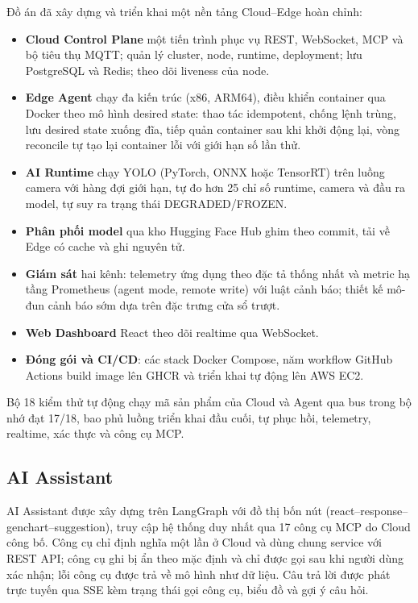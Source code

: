 Đồ án đã xây dựng và triển khai một nền tảng Cloud--Edge hoàn chỉnh:
\begin{itemize}
  \item \textbf{Cloud Control Plane} một tiến trình phục vụ REST, WebSocket, MCP
        và bộ tiêu thụ MQTT; quản lý cluster, node, runtime, deployment; lưu
        PostgreSQL và Redis; theo dõi liveness của node.
  \item \textbf{Edge Agent} chạy đa kiến trúc (x86, ARM64), điều khiển container
        qua Docker theo mô hình desired state: thao tác idempotent, chống lệnh
        trùng, lưu desired state xuống đĩa, tiếp quản container sau khi khởi động
        lại, vòng reconcile tự tạo lại container lỗi với giới hạn số lần thử.
  \item \textbf{AI Runtime} chạy YOLO (PyTorch, ONNX hoặc TensorRT) trên luồng
        camera với hàng đợi giới hạn, tự đo hơn 25 chỉ số runtime, camera và đầu ra
        model, tự suy ra trạng thái DEGRADED/FROZEN.
  \item \textbf{Phân phối model} qua kho Hugging Face Hub ghim theo commit, tải về
        Edge có cache và ghi nguyên tử.
  \item \textbf{Giám sát} hai kênh: telemetry ứng dụng theo đặc tả thống nhất và
        metric hạ tầng Prometheus (agent mode, remote write) với luật cảnh báo;
        thiết kế mô-đun cảnh báo sớm dựa trên đặc trưng cửa sổ trượt.
  \item \textbf{Web Dashboard} React theo dõi realtime qua WebSocket.
  \item \textbf{Đóng gói và CI/CD}: các stack Docker Compose, năm workflow GitHub
        Actions build image lên GHCR và triển khai tự động lên AWS EC2.
\end{itemize}
Bộ 18 kiểm thử tự động chạy mã sản phẩm của Cloud và Agent qua bus trong bộ nhớ
đạt 17/18, bao phủ luồng triển khai đầu cuối, tự phục hồi, telemetry, realtime,
xác thực và công cụ MCP.

\subsection{AI Assistant}

AI Assistant được xây dựng trên LangGraph với đồ thị bốn nút
(react--response--genchart--suggestion), truy cập hệ thống duy nhất qua 17 công
cụ MCP do Cloud công bố. Công cụ chỉ định nghĩa một lần ở Cloud và dùng chung
service với REST API; công cụ ghi bị ẩn theo mặc định và chỉ được gọi sau khi
người dùng xác nhận; lỗi công cụ được trả về mô hình như dữ liệu. Câu trả lời
được phát trực tuyến qua SSE kèm trạng thái gọi công cụ, biểu đồ và gợi ý câu hỏi.
